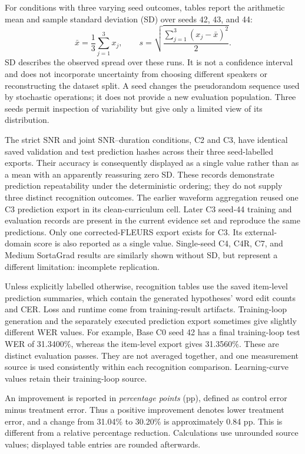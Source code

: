 \documentclass[12pt,a4paper]{report}
\begin{document}
For conditions with three varying seed outcomes, tables report the arithmetic mean and sample standard deviation (SD) over seeds 42, 43, and 44:
\begin{equation}
 \bar{x}=\frac{1}{3}\sum_{j=1}^{3}x_j,
 \qquad s=\sqrt{\frac{\sum_{j=1}^{3}(x_j-\bar{x})^2}{2}}.
\end{equation}
SD describes the observed spread over these runs. It is not a confidence interval and does not incorporate uncertainty from choosing different speakers or reconstructing the dataset split. A seed changes the pseudorandom sequence used by stochastic operations; it does not provide a new evaluation population. Three seeds permit inspection of variability but give only a limited view of its distribution.

The strict SNR and joint SNR--duration conditions, C2 and C3, have identical saved validation and test prediction hashes across their three seed-labelled exports. Their accuracy is consequently displayed as a single value rather than as a mean with an apparently reassuring zero SD. These records demonstrate prediction repeatability under the deterministic ordering; they do not supply three distinct recognition outcomes. The earlier waveform aggregation reused one C3 prediction export in its clean-curriculum cell. Later C3 seed-44 training and evaluation records are present in the current evidence set and reproduce the same predictions. Only one corrected-FLEURS export exists for C3. Its external-domain score is also reported as a single value. Single-seed C4, C4R, C7, and Medium SortaGrad results are similarly shown without SD, but represent a different limitation: incomplete replication.

Unless explicitly labelled otherwise, recognition tables use the saved item-level prediction summaries, which contain the generated hypotheses' word edit counts and CER. Loss and runtime come from training-result artifacts. Training-loop generation and the separately executed prediction export sometimes give slightly different WER values. For example, Base C0 seed 42 has a final training-loop test WER of 31.3400\%, whereas the item-level export gives 31.3560\%. These are distinct evaluation passes. They are not averaged together, and one measurement source is used consistently within each recognition comparison. Learning-curve values retain their training-loop source.

An improvement is reported in \emph{percentage points} (pp), defined as control error minus treatment error. Thus a positive improvement denotes lower treatment error, and a change from 31.04\% to 30.20\% is approximately 0.84 pp. This is different from a relative percentage reduction. Calculations use unrounded source values; displayed table entries are rounded afterwards.
\end{document}

